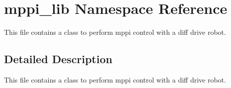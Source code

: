 \hypertarget{namespacemppi__lib}{}\section{mppi\+\_\+lib Namespace Reference}
\label{namespacemppi__lib}


This file contains a class to perform mppi control with a diff drive robot.  




\subsection{Detailed Description}
This file contains a class to perform mppi control with a diff drive robot. 